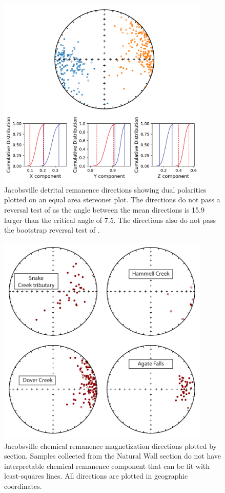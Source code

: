 \documentclass[11pt,letterpaper]{article}
\begin{document}
\begin{figure}[h!]
\centering
\includegraphics[width=0.9\textwidth]{SI_reversal_test.pdf}
\caption{Jacobsville detrital remanence directions showing dual polarities plotted on an equal area stereonet plot. The directions do not pass a reversal test of \cite{McFadden1990a} as the angle between the mean directions is 15.9\textdegree\, larger than the critical angle of 7.5\textdegree. The directions also do not pass the bootstrap reversal test of \cite{Tauxe1991a}. }
\label{fig:Jacobsville_reversal_test}
\end{figure}

\begin{figure}[h!]
\centering
\includegraphics[width=0.9\textwidth]{SI_hct.pdf}
\caption{Jacobsville chemical remanence magnetization directions plotted by section. Samples collected from the Natural Wall section do not have interpretable chemical remanence component that can be fit with least-squares lines. All directions are plotted in geographic coordinates.}
\label{fig:Jacobsville_CRM}
\end{figure}
\end{document}
